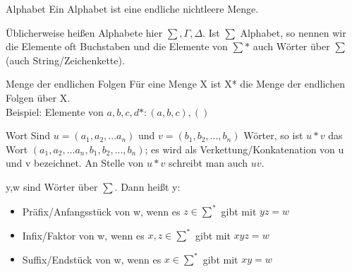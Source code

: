 \documentclass[avery5371]{flashcards}
\begin{document}


\begin{flashcard}[Definition]{Alphabet}
Ein Alphabet ist eine endliche nichtleere Menge.

Üblicherweise heißen Alphabete hier $\sum, \Gamma, \Delta$. Ist $\sum$ Alphabet, so nennen wir die Elemente oft Buchstaben und die Elemente von $\sum*$ auch Wörter über $\sum$ (auch String/Zeichenkette).
\end{flashcard}


\begin{flashcard}[Definition]{Menge der endlichen Folgen}
    Für eine Menge X ist X* die Menge der endlichen Folgen über X.\\

    Beispiel: Elemente von ${a,b,c,d}*:(a,b,c),()$
\end{flashcard}


\begin{flashcard}[Definition]{Wort}
Sind $u=(a_1, a_2, ...a_n)$ und $v=(b_1, b_2,...,b_n)$ Wörter, so ist $u*v$ das Wort $(a_1,a_2,...a_n,b_1,b_2,...,b_n)$; es wird als Verkettung/Konkatenation von u und v bezeichnet.
An Stelle von $u*v$ schreibt man auch $uv$.
\end{flashcard}


\begin{flashcard}[Definition]{Induktiv $w^n$ definieren}
$$w^n = \begin{cases} \epsilon \quad{} n=0 \\ {w * w^{n-1}} \quad\textfalls } n>0 \end{cases}$$
\end{flashcard}


\begin{flashcard}[Definition]{y,w sind Wörter über $\sum$. Dann heißt y:}
\begin{itemize}
    \item Präfix/Anfangsstück von w, wenn es $z\in\sum^*$ gibt mit $yz=w$
    \item Infix/Faktor von w, wenn es $x,z\in\sum^*$ gibt mit $xyz = w$
    \item Suffix/Endstück von w, wenn es $x\in\sum^*$ gibt mit $xy=w$
\end{itemize}    
\end{flashcard}
\end{document}
